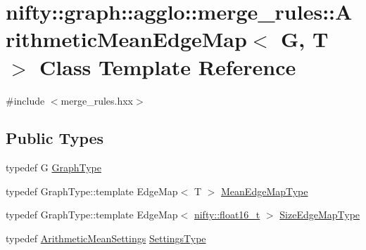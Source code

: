 \hypertarget{classnifty_1_1graph_1_1agglo_1_1merge__rules_1_1ArithmeticMeanEdgeMap}{}\section{nifty\+:\+:graph\+:\+:agglo\+:\+:merge\+\_\+rules\+:\+:Arithmetic\+Mean\+Edge\+Map$<$ G, T $>$ Class Template Reference}
\label{classnifty_1_1graph_1_1agglo_1_1merge__rules_1_1ArithmeticMeanEdgeMap}


{\ttfamily \#include $<$merge\+\_\+rules.\+hxx$>$}

\subsection*{Public Types}
\begin{DoxyCompactItemize}
\item 
typedef G \hyperlink{classnifty_1_1graph_1_1agglo_1_1merge__rules_1_1ArithmeticMeanEdgeMap_a920251c7296554c793d991a09938cc0f}{Graph\+Type}
\item 
typedef Graph\+Type\+::template Edge\+Map$<$ T $>$ \hyperlink{classnifty_1_1graph_1_1agglo_1_1merge__rules_1_1ArithmeticMeanEdgeMap_a81130e05d85be89cc569cab155332d57}{Mean\+Edge\+Map\+Type}
\item 
typedef Graph\+Type\+::template Edge\+Map$<$ \hyperlink{namespacenifty_a20031b62bd5c16b943905d43a8ed361a}{nifty\+::float16\+\_\+t} $>$ \hyperlink{classnifty_1_1graph_1_1agglo_1_1merge__rules_1_1ArithmeticMeanEdgeMap_a2d697e72339ef4155e249f0b785b82a9}{Size\+Edge\+Map\+Type}
\item 
typedef \hyperlink{structnifty_1_1graph_1_1agglo_1_1merge__rules_1_1ArithmeticMeanSettings}{Arithmetic\+Mean\+Settings} \hyperlink{classnifty_1_1graph_1_1agglo_1_1merge__rules_1_1ArithmeticMeanEdgeMap_a356668f9c14aae4ff88d90a232923766}{Settings\+Type}
\end{DoxyCompactItemize}
